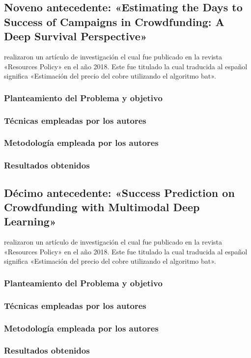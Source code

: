 \subsection{Noveno antecedente: «Estimating the Days to Success of Campaigns in Crowdfunding: A Deep Survival Perspective» \citep*{pr_jin2019dayssuccess}}
\citeauthor{pr_jin2019dayssuccess} realizaron un artículo de investigación el cual fue publicado en la revista «Resources Policy» en el año 2018. Este fue titulado  la cual traducida al español significa «Estimación del precio del cobre utilizando el algoritmo bat».

\subsubsection{Planteamiento del Problema y objetivo }


\subsubsection{Técnicas empleadas por los autores}


\subsubsection{Metodología empleada por los autores}


\subsubsection{Resultados obtenidos}



\subsection{Décimo antecedente: «Success Prediction on Crowdfunding with Multimodal Deep Learning» \citep*{pr_cheng2019deeplearning}}
\citeauthor{pr_cheng2019deeplearning} realizaron un artículo de investigación el cual fue publicado en la revista «Resources Policy» en el año 2018. Este fue titulado  la cual traducida al español significa «Estimación del precio del cobre utilizando el algoritmo bat».

\subsubsection{Planteamiento del Problema y objetivo }


\subsubsection{Técnicas empleadas por los autores}
 

\subsubsection{Metodología empleada por los autores}


\subsubsection{Resultados obtenidos}
